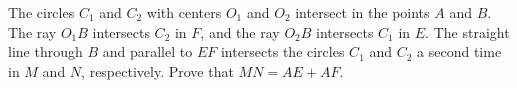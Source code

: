 The circles $C_1$ and $C_2$ with centers $O_1$ and $O_2$ intersect in the points $A$ and $B$. The ray $O_1B$ intersects $C_2$ in $F$, and the ray $O_2B$ intersects $C_1$ in $E$. The straight line through $B$ and parallel to $EF$ intersects the circles $C_1$ and $C_2$ a second time in $M$ and $N$, respectively. Prove that $MN = AE + AF$.
